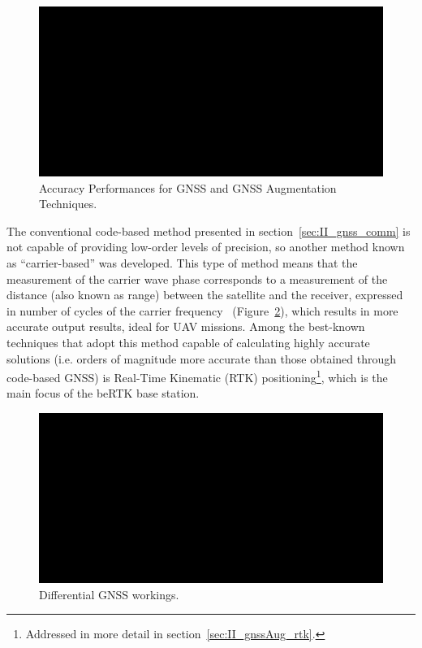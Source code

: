 \begin{figure}[ht]
	\centering
	\includegraphics[width=1.0\textwidth]{Chapters/Figures/demo.png}
	\caption{Accuracy Performances for GNSS and GNSS Augmentation Techniques.}
	\label{fig:accuracy_perfromances}
\end{figure}



The conventional code-based method presented in section~\ref{sec:II_gnss_comm} is not capable of providing low-order levels of precision, so another method known as ``carrier-based'' was developed.
This type of method means that the measurement of the carrier wave phase corresponds to a measurement of the distance (also known as range) between the satellite and the receiver, expressed in number of cycles of the carrier frequency~\cite{inside_GNSS} (Figure~\ref{fig:dgnss_corrections}), which results in more accurate output results, ideal for UAV missions.
Among the best-known techniques that adopt this method capable of calculating highly accurate solutions (i.e. orders of magnitude more accurate than those obtained through code-based GNSS) is Real-Time Kinematic (RTK) positioning\footnote{Addressed in more detail in section~\ref{sec:II_gnssAug_rtk}.}, which is the main focus of the beRTK base station.
\begin{figure}[ht]
	\centering
	\includegraphics[width=1.0\textwidth]{Chapters/Figures/demo.png}
	\caption{Differential GNSS workings.}
	\label{fig:dgnss_corrections}
\end{figure}

